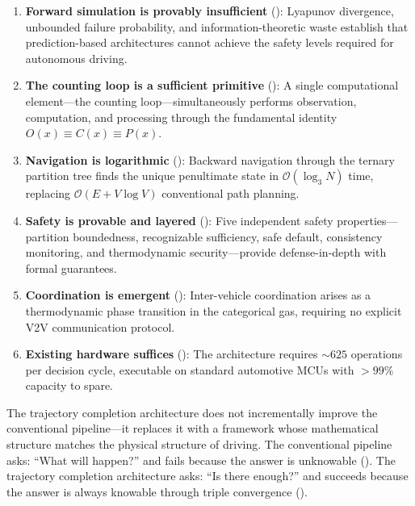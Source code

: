 \documentclass[twocolumn,10pt]{article}
\theoremstyle{definition}
\newcommand{\BigO}{\mathcal{O}}
\begin{document}
\begin{enumerate}[leftmargin=*]
\item \textbf{Forward simulation is provably insufficient} (): Lyapunov divergence, unbounded failure probability, and information-theoretic waste establish that prediction-based architectures cannot achieve the safety levels required for autonomous driving.

\item \textbf{The counting loop is a sufficient primitive} (): A single computational element---the counting loop---simultaneously performs observation, computation, and processing through the fundamental identity $O(x) \equiv C(x) \equiv P(x)$.

\item \textbf{Navigation is logarithmic} (): Backward navigation through the ternary partition tree finds the unique penultimate state in $\BigO(\log_3 N)$ time, replacing $\BigO(E + V \log V)$ conventional path planning.

\item \textbf{Safety is provable and layered} (): Five independent safety properties---partition boundedness, recognizable sufficiency, safe default, consistency monitoring, and thermodynamic security---provide defense-in-depth with formal guarantees.

\item \textbf{Coordination is emergent} (): Inter-vehicle coordination arises as a thermodynamic phase transition in the categorical gas, requiring no explicit V2V communication protocol.

\item \textbf{Existing hardware suffices} (): The architecture requires $\sim 625$ operations per decision cycle, executable on standard automotive MCUs with $>99\%$ capacity to spare.
\end{enumerate}

The trajectory completion architecture does not incrementally improve the conventional pipeline---it replaces it with a framework whose mathematical structure matches the physical structure of driving. The conventional pipeline asks: ``What will happen?'' and fails because the answer is unknowable (). The trajectory completion architecture asks: ``Is there enough?'' and succeeds because the answer is always knowable through triple convergence ().
\end{document}
